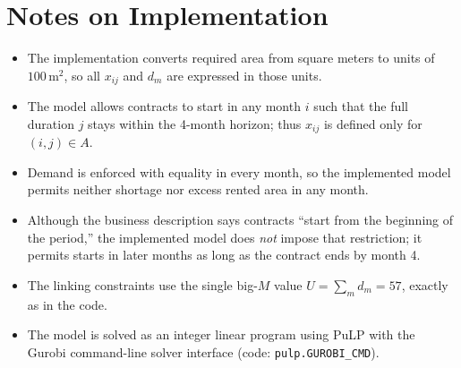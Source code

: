 \section*{Notes on Implementation}

\begin{itemize}
    \item The implementation converts required area from square meters to units of $100\,\text{m}^2$, so all $x_{ij}$ and $d_m$ are expressed in those units.
    \item The model allows contracts to start in any month $i$ such that the full duration $j$ stays within the 4-month horizon; thus $x_{ij}$ is defined only for $(i,j)\in A$.
    \item Demand is enforced with equality in every month, so the implemented model permits neither shortage nor excess rented area in any month.
    \item Although the business description says contracts ``start from the beginning of the period,'' the implemented model does \emph{not} impose that restriction; it permits starts in later months as long as the contract ends by month 4.
    \item The linking constraints use the single big-$M$ value $U=\sum_m d_m=57$, exactly as in the code.
    \item The model is solved as an integer linear program using PuLP with the Gurobi command-line solver interface (code: \texttt{pulp.GUROBI\_CMD}).
\end{itemize}

